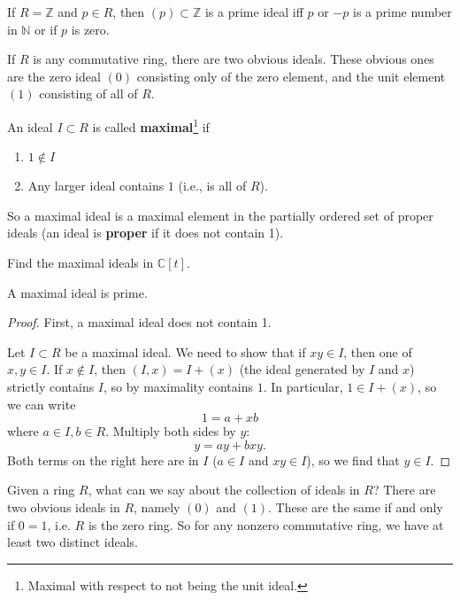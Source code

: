 \begin{example}
\label{integerprimes}
If $R = \mathbb{Z}$ and $p \in R$, then $(p) \subset \mathbb{Z}$ is a prime ideal iff $p$ or $-p$ is a
prime number in $\mathbb{N}$ or if $p$ is zero. 
\end{example} 

If $R$ is any commutative ring, there are two obvious ideals. These obvious
ones are the zero ideal $(0)$
consisting only of the zero element, and the unit element $(1)$ consisting of all of
$R$.


\begin{definition} \label{maximalideal}
An ideal $I \subset R$ is called \textbf{maximal}\footnote{Maximal with
respect to not being the unit ideal.} if 
\begin{enumerate}[\textbf{M} 1]
\item  $1 \notin I$
\item Any larger ideal contains $1$ (i.e., is all of $R$).
\end{enumerate}
\end{definition} 

So a maximal ideal is a maximal element in the partially ordered set of proper
ideals (an ideal is \textbf{proper} if it does not contain 1).

\begin{exercise} 
Find the maximal ideals in $\mathbb{C}[t]$.
\end{exercise} 


\begin{proposition} 
A maximal ideal is prime.
\end{proposition} 
\begin{proof} 
First, a maximal ideal does not contain 1.

Let $I \subset R$ be a maximal ideal.
We need to show that if $xy \in I$,
then one of $x,y \in I$.  If $x \notin I$, then $(I,x) = I + (x)$ (the ideal
generated by $I$ and $x$) strictly contains $I$, so by maximality contains
$1$.  In particular, $1 \in I+(x)$, so we can write
\[ 1 = a + xb  \]
where $a \in I, b \in R$. Multiply both sides by $y$:
\[ y = ay  + bxy.  \]
Both terms on the right here are in $I$ ($a \in I$ and $xy \in I$), so we find
that $y \in I$.

\end{proof} 

Given a ring $R$, what can we say about the collection of ideals in $R$?
There
are two obvious ideals in $R$, namely $(0)$ and $ (1)$.  These are the same if and
only if $0=1$, i.e. $R$ is the zero ring.
So for any nonzero commutative ring, we have at least two distinct ideals.  

